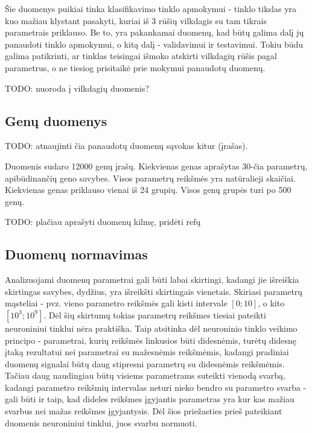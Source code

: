 \documentclass{VUMIFPSbakalaurinis}
\newcommand{\TODO}[1]{
\colorbox{todo-background-color}{TODO: #1}
}
\begin{document}
Šie duomenys puikiai tinka klasifikavimo tinklo apmokymui - tinklo tikslas yra kuo mažiau klystant pasakyti, kuriai iš 3 rūšių vilkdagis su tam tikrais parametrais priklauso.
Be to, yra pakankamai duomenų, kad būtų galima dalį jų panaudoti tinklo apmokymui, o kitą dalį - validavimui ir testavimui.
Tokiu būdu galima patikrinti, ar tinklas teisingai išmoko atskirti vilkdagių rūšis pagal parametrus, o ne tiesiog prisitaikė prie mokymui panaudotų duomenų.

\TODO{nuoroda į vilkdagių duomenis?}



\subsection{Genų duomenys}

\TODO{atnaujinti čia panaudotų duomenų sąvokas kitur (įrašas).}

Duomenis sudaro 12000 genų įrašų.
Kiekvienas genas aprašytas 30-čia parametrų, apibūdinančių geno savybes.
Visos parametrų reikšmės yra natūralieji skaičiai.
Kiekvienas genas priklauso vienai iš 24 grupių.
Visos genų grupės turi po 500 genų.

\TODO{plačiau aprašyti duomenų kilmę, pridėti refų}



\subsection{Duomenų normavimas}

Analizuojami duomenų parametrai gali būti labai skirtingi, kadangi jie išreiškia skirtingas savybes, dydžius, yra išreikšti skirtingais vienetais.
Skiriasi parametrų mąsteliai - pvz. vieno parametro reikšmės gali kisti intervale $[0; 10]$, o kito $[10^3; 10^9]$.
Dėl šių skirtumų tokias parametrų reikšmes tiesiai pateikti neuroniniui tinklui nėra praktiška.
Taip atsitinka dėl neuroninio tinklo veikimo principo - parametrai, kurių reikšmės linkusios būti didesnėmis, turėtų didesnę įtaką rezultatui nei parametrai su mažesnėmis reikšmėmis, kadangi pradiniai duomenų signalai būtų daug stipresni parametrų su didesnėmis reikšmėmis.
Tačiau daug naudingiau būtų visiems parametrams suteikti vienodą svarbą, kadangi parametro reikšmių intervalas neturi nieko bendro su parametro svarba - gali būti ir taip, kad dideles reikšmes įgyjantis parametras yra kur kas mažiau svarbus nei mažas reikšmes įgyjantysis.
Dėl šios priežasties prieš pateikiant duomenis neuroniniui tinklui, juos svarbu normuoti.
\end{document}
